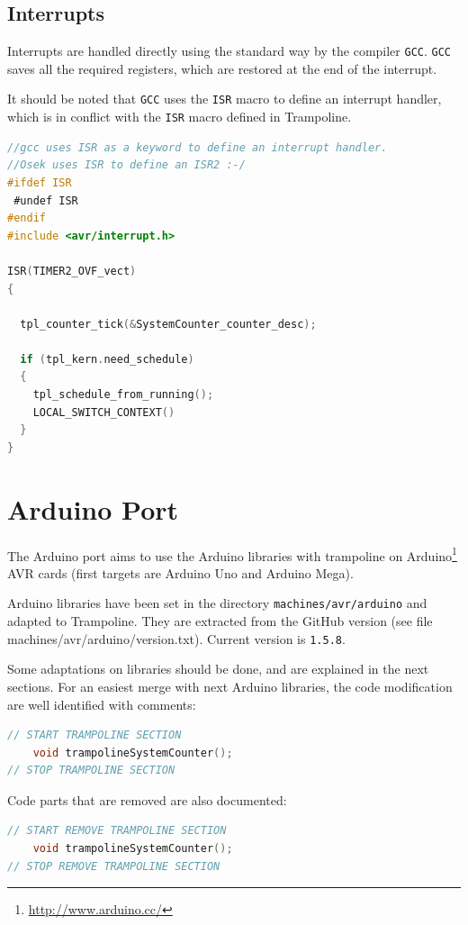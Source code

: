 \subsection{Interrupts}
Interrupts are handled directly using the standard way by the compiler \texttt{GCC}. \texttt{GCC} saves all the required registers, which are restored at the end of the interrupt.

It should be noted that \texttt{GCC} uses the \texttt{ISR} macro to define an interrupt handler, which is in conflict with the \texttt{ISR} macro defined in Trampoline.

\begin{lstlisting}[language=C]
//gcc uses ISR as a keyword to define an interrupt handler.
//Osek uses ISR to define an ISR2 :-/
#ifdef ISR
 #undef ISR
#endif
#include <avr/interrupt.h>

ISR(TIMER2_OVF_vect)
{

  tpl_counter_tick(&SystemCounter_counter_desc);

  if (tpl_kern.need_schedule)
  {
    tpl_schedule_from_running();
    LOCAL_SWITCH_CONTEXT()
  }
}	
\end{lstlisting}

\section{Arduino Port}
The Arduino port aims to use the Arduino libraries with trampoline on Arduino\footnote{\url{http://www.arduino.cc/}} AVR cards (first targets are Arduino Uno and Arduino Mega).

Arduino libraries have been set in the directory \texttt{machines/avr/arduino} and adapted to Trampoline. They are extracted from the GitHub version (see file machines/avr/arduino/version.txt). Current version is \texttt{1.5.8}.

Some adaptations on libraries should be done, and are explained in the next sections. For an easiest merge with next Arduino libraries, the code modification are well identified with comments:

\begin{lstlisting}[language=C]
// START TRAMPOLINE SECTION 
	void trampolineSystemCounter();
// STOP TRAMPOLINE SECTION 
\end{lstlisting}

Code parts that are removed are also documented:
\begin{lstlisting}[language=C]
// START REMOVE TRAMPOLINE SECTION
	void trampolineSystemCounter();
// STOP REMOVE TRAMPOLINE SECTION
\end{lstlisting}

